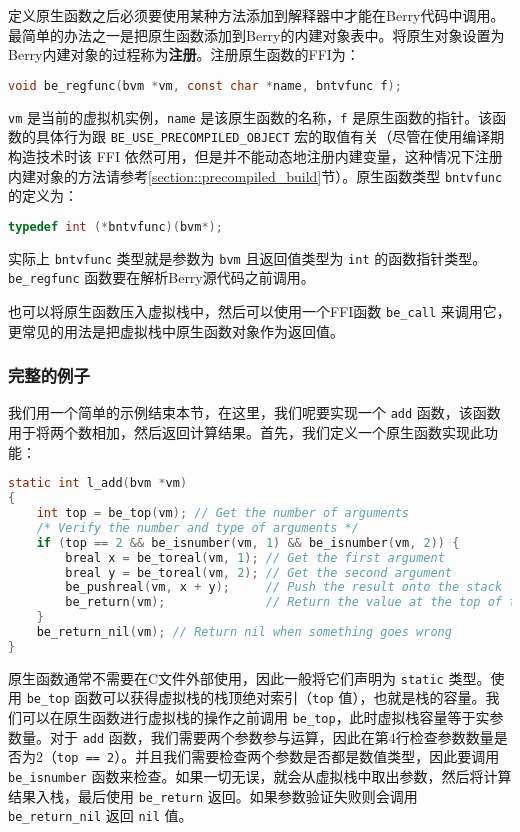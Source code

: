 定义原生函数之后必须要使用某种方法添加到解释器中才能在Berry代码中调用。最简单的办法之一是把原生函数添加到Berry的内建对象表中。将原生对象设置为Berry内建对象的过程称为\textbf{注册}。注册原生函数的FFI为：
\begin{lstlisting}[language=c, style=berry, numbers=none]
void be_regfunc(bvm *vm, const char *name, bntvfunc f);
\end{lstlisting}
\texttt{vm} 是当前的虚拟机实例，\texttt{name} 是该原生函数的名称，\texttt{f} 是原生函数的指针。该函数的具体行为跟 \texttt{BE\_USE\_PRECOMPILED\_OBJECT} 宏的取值有关（尽管在使用编译期构造技术时该 FFI 依然可用，但是并不能动态地注册内建变量，这种情况下注册内建对象的方法请参考\ref{section::precompiled_build}节）。原生函数类型 \texttt{bntvfunc} 的定义为：
\begin{lstlisting}[language=c, style=berry, numbers=none]
typedef int (*bntvfunc)(bvm*);
\end{lstlisting}
实际上 \texttt{bntvfunc} 类型就是参数为 \texttt{bvm} 且返回值类型为 \texttt{int} 的函数指针类型。\texttt{be\_regfunc} 函数要在解析Berry源代码之前调用。

也可以将原生函数压入虚拟栈中，然后可以使用一个FFI函数 \texttt{be\_call} 来调用它，更常见的用法是把虚拟栈中原生函数对象作为返回值。

\subsubsection{完整的例子}

我们用一个简单的示例结束本节，在这里，我们呢要实现一个 \texttt{add} 函数，该函数用于将两个数相加，然后返回计算结果。首先，我们定义一个原生函数实现此功能：
\begin{lstlisting}[language=c, style=berry]
static int l_add(bvm *vm)
{
    int top = be_top(vm); // Get the number of arguments
    /* Verify the number and type of arguments */
    if (top == 2 && be_isnumber(vm, 1) && be_isnumber(vm, 2)) {
        breal x = be_toreal(vm, 1); // Get the first argument
        breal y = be_toreal(vm, 2); // Get the second argument
        be_pushreal(vm, x + y);     // Push the result onto the stack
        be_return(vm);              // Return the value at the top of the stack
    }
    be_return_nil(vm); // Return nil when something goes wrong
}
\end{lstlisting}
原生函数通常不需要在C文件外部使用，因此一般将它们声明为 \texttt{static} 类型。使用 \texttt{be\_top} 函数可以获得虚拟栈的栈顶绝对索引（\texttt{top} 值），也就是栈的容量。我们可以在原生函数进行虚拟栈的操作之前调用 \texttt{be\_top}，此时虚拟栈容量等于实参数量。对于 \texttt{add} 函数，我们需要两个参数参与运算，因此在第4行检查参数数量是否为2（\texttt{top == 2}）。并且我们需要检查两个参数是否都是数值类型，因此要调用 \texttt{be\_isnumber} 函数来检查。如果一切无误，就会从虚拟栈中取出参数，然后将计算结果入栈，最后使用 \texttt{be\_return} 返回。如果参数验证失败则会调用 \texttt{be\_return\_nil} 返回 \texttt{nil} 值。

